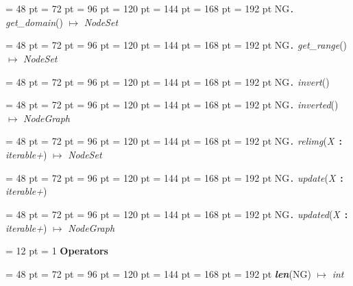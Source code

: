 {{{{\par \noindent  \leftskip = 48 pt  \leftmargini = 72 pt  \leftmarginii = 96 pt  \leftmarginiii = 120 pt  \leftmarginiv = 144 pt  \leftmarginv = 168 pt  \leftmarginvi = 192 pt NG{\large {\tt .\/} {\em get{\_}domain\/}}() \(\mapsto \)  {\em NodeSet\/}\par}
{\par \noindent  \leftskip = 48 pt  \leftmargini = 72 pt  \leftmarginii = 96 pt  \leftmarginiii = 120 pt  \leftmarginiv = 144 pt  \leftmarginv = 168 pt  \leftmarginvi = 192 pt NG{\large {\tt .\/} {\em get{\_}range\/}}() \(\mapsto \)  {\em NodeSet\/}\par}
{\par \noindent  \leftskip = 48 pt  \leftmargini = 72 pt  \leftmarginii = 96 pt  \leftmarginiii = 120 pt  \leftmarginiv = 144 pt  \leftmarginv = 168 pt  \leftmarginvi = 192 pt NG{\large {\tt .\/} {\em invert\/}}()\par}
{\par \noindent  \leftskip = 48 pt  \leftmargini = 72 pt  \leftmarginii = 96 pt  \leftmarginiii = 120 pt  \leftmarginiv = 144 pt  \leftmarginv = 168 pt  \leftmarginvi = 192 pt NG{\large {\tt .\/} {\em inverted\/}}() \(\mapsto \)  {\em NodeGraph\/}\par}
{\par \noindent  \leftskip = 48 pt  \leftmargini = 72 pt  \leftmarginii = 96 pt  \leftmarginiii = 120 pt  \leftmarginiv = 144 pt  \leftmarginv = 168 pt  \leftmarginvi = 192 pt NG{\large {\tt .\/} {\em relimg\/}}({\em X\/}~{\bf :}  {\em iterable+\/}) \(\mapsto \)  {\em NodeSet\/}\par}
{\par \noindent  \leftskip = 48 pt  \leftmargini = 72 pt  \leftmarginii = 96 pt  \leftmarginiii = 120 pt  \leftmarginiv = 144 pt  \leftmarginv = 168 pt  \leftmarginvi = 192 pt NG{\large {\tt .\/} {\em update\/}}({\em X\/}~{\bf :}  {\em iterable+\/})\par}
{\par \noindent  \leftskip = 48 pt  \leftmargini = 72 pt  \leftmarginii = 96 pt  \leftmarginiii = 120 pt  \leftmarginiv = 144 pt  \leftmarginv = 168 pt  \leftmarginvi = 192 pt NG{\large {\tt .\/} {\em updated\/}}({\em X\/}~{\bf :}  {\em iterable+\/}) \(\mapsto \)  {\em NodeGraph\/}\par}
{\par \pagebreak[3.200000] \noindent \hangindent = 12 pt \hangafter = 1 
{\bf {\large {\bf Operators\/}}\/}\par}
{\par \noindent  \leftskip = 48 pt  \leftmargini = 72 pt  \leftmarginii = 96 pt  \leftmarginiii = 120 pt  \leftmarginiv = 144 pt  \leftmarginv = 168 pt  \leftmarginvi = 192 pt  {\em {\large {\bf len\/}}\/}(NG) \(\mapsto \)  {\em int\/}\par}
}}}
